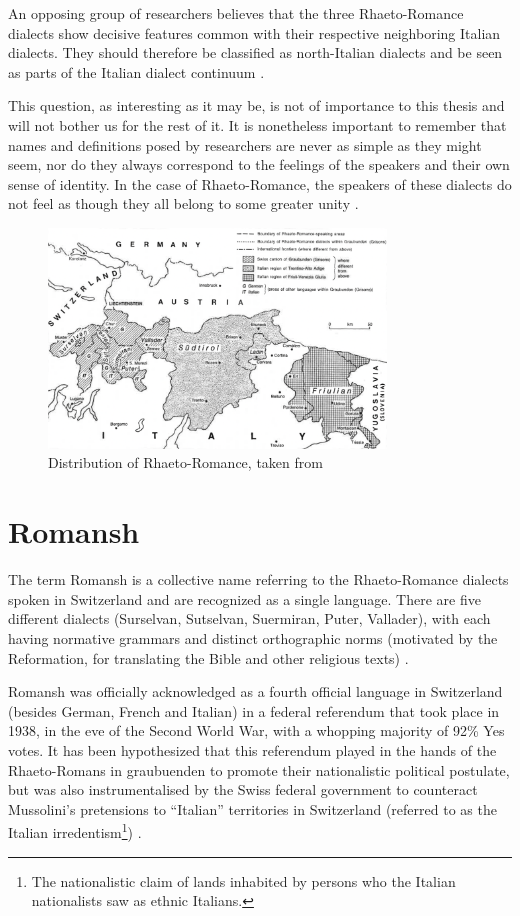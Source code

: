 An opposing group of researchers believes that the three Rhaeto-Romance dialects show decisive  features common with their respective neighboring Italian dialects. 
They should therefore be classified as north-Italian dialects and be seen as parts of the Italian dialect continuum \autocite[174]{bossong2008}.

This question, as interesting as it may be, is not of importance to this thesis and will not bother us for the rest of it.
It is nonetheless important to remember that names and definitions posed by researchers are never as simple as they might seem, nor do they always correspond to the feelings of the speakers and their own sense of identity. 
In the case of Rhaeto-Romance, the speakers of these dialects do not feel as though they all belong to some greater unity \autocite[175]{bossong2008}.

\begin{figure}
\centering
\includegraphics[width=0.8\textwidth]{graphics/raeto-map.png}
\caption[Map of the distribution of Rhaeto-Romance]{Distribution of Rhaeto-Romance, taken from \cite[2]{haiman1992}}
\label{fig:raeto-map}
\end{figure}

\section{Romansh}
The term Romansh is a collective name referring to the Rhaeto-Romance dialects spoken in Switzerland and are recognized as a single language. 
There are five different dialects (Surselvan, Sutselvan, Suermiran, Puter, Vallader), with each having normative grammars and distinct orthographic norms (motivated by the Reformation, for translating the Bible and other religious texts) \autocites[1]{haiman1992}[178]{bossong2008}.

Romansh was officially acknowledged as a fourth official language in Switzerland (besides German, French and Italian) in a federal referendum that took place in 1938, in the eve of the Second World War, with a whopping majority of 92\% Yes votes. 
It has been hypothesized that this referendum played in the hands of the Rhaeto-Romans in \Gls{graubuenden} to promote their nationalistic political postulate, but was also instrumentalised by the Swiss federal government to counteract Mussolini's pretensions to \enquote{Italian} territories in Switzerland (referred to as the Italian irredentism\footnote{The nationalistic claim of lands inhabited by persons who the Italian nationalists saw as ethnic Italians.}) \autocite{valaer2012}.

